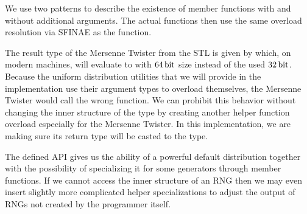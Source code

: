 \documentclass{stdlocal}
\begin{document}
    We use two  patterns to describe the existence of  member functions with and without additional arguments.
    The actual  functions then use the same overload resolution via SFINAE as the  function.

    The result type of the Mersenne Twister  from the STL is given by  which, on modern machines, will evaluate to  with $64\, \mathrm{bit}$ size instead of the used $32\, \mathrm{bit}$.
    Because the uniform distribution utilities that we will provide in the implementation use their argument types to overload themselves, the Mersenne Twister would call the wrong function.
    We can prohibit this behavior without changing the inner structure of the  type by creating another helper function overload especially for the Mersenne Twister.
    In this implementation, we are making sure its return type will be casted to the  type.

    The defined API gives us the ability of a powerful default distribution together with the possibility of specializing it for some generators through member functions.
    If we cannot access the inner structure of an RNG then we may even insert slightly more complicated helper specializations to adjust the output of RNGs not created by the programmer itself.


\end{document}
